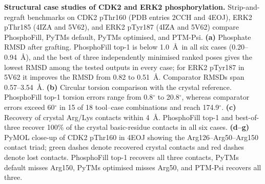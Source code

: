 \caption{\textbf{Structural case studies of CDK2 and ERK2 phosphorylation.} Strip-and-regraft benchmarks on CDK2 pThr160 (PDB entries 2CCH and 4EOJ), ERK2 pThr185 (4IZA and 5V62), and ERK2 pTyr187 (4IZA and 5V62) compare PhosphoFill, PyTMs default, PyTMs optimised, and PTM-Psi. \textbf{(a)} Phosphate RMSD after grafting. PhosphoFill top-1 is below 1.0~\AA\ in all six cases (0.20--0.94~\AA), and the best of three independently minimised ranked poses gives the lowest RMSD among the tested outputs in every case; for ERK2 pTyr187 in 5V62 it improves the RMSD from 0.82 to 0.51~\AA. Comparator RMSDs span 0.57--3.54~\AA. \textbf{(b)} Circular torsion comparison with the crystal reference. PhosphoFill top-1 torsion errors range from 0.8$^{\circ}$ to 20.8$^{\circ}$, whereas comparator errors exceed 60$^{\circ}$ in 15 of 18 tool--case combinations and reach 174.9$^{\circ}$. \textbf{(c)} Recovery of crystal Arg/Lys contacts within 4~\AA. PhosphoFill top-1 and best-of-three recover 100\% of the crystal basic-residue contacts in all six cases. \textbf{(d--g)} PyMOL close-up of CDK2 pThr160 in 4EOJ showing the Arg126--Arg50--Arg150 contact triad; green dashes denote recovered crystal contacts and red dashes denote lost contacts. PhosphoFill top-1 recovers all three contacts, PyTMs default misses Arg150, PyTMs optimised misses Arg50, and PTM-Psi recovers all three.}

